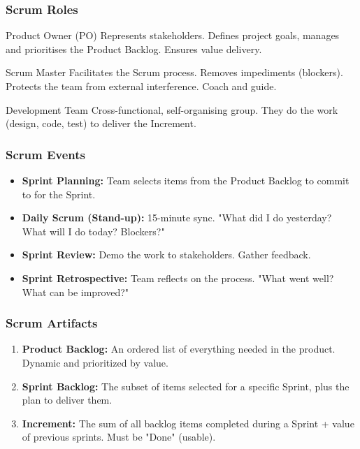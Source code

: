\documentclass[xcolor=table]{beamer}
\begin{document}
\begin{frame}
    \frametitle{Scrum Roles}
    \begin{block}{Product Owner (PO)}
        Represents stakeholders. Defines project goals, manages and prioritises the Product Backlog. Ensures value delivery.
    \end{block}
    
    \begin{block}{Scrum Master}
        Facilitates the Scrum process. Removes impediments (blockers). Protects the team from external interference. Coach and guide.
    \end{block}
    
    \begin{block}{Development Team}
        Cross-functional, self-organising group. They do the work (design, code, test) to deliver the Increment.
    \end{block}
\end{frame}

\begin{frame}
    \frametitle{Scrum Events}
    \begin{itemize}
        \item \textbf{Sprint Planning:} Team selects items from the Product Backlog to commit to for the Sprint.
        \item \textbf{Daily Scrum (Stand-up):} 15-minute sync. "What did I do yesterday? What will I do today? Blockers?"
        \item \textbf{Sprint Review:} Demo the work to stakeholders. Gather feedback.
        \item \textbf{Sprint Retrospective:} Team reflects on the process. "What went well? What can be improved?"
    \end{itemize}
\end{frame}

\begin{frame}
    \frametitle{Scrum Artifacts}
    \begin{enumerate}
        \item \textbf{Product Backlog:} An ordered list of everything needed in the product. Dynamic and prioritized by value.
        \item \textbf{Sprint Backlog:} The subset of items selected for a specific Sprint, plus the plan to deliver them.
        \item \textbf{Increment:} The sum of all backlog items completed during a Sprint + value of previous sprints. Must be "Done" (usable).
    \end{enumerate}
\end{frame}
\end{document}
